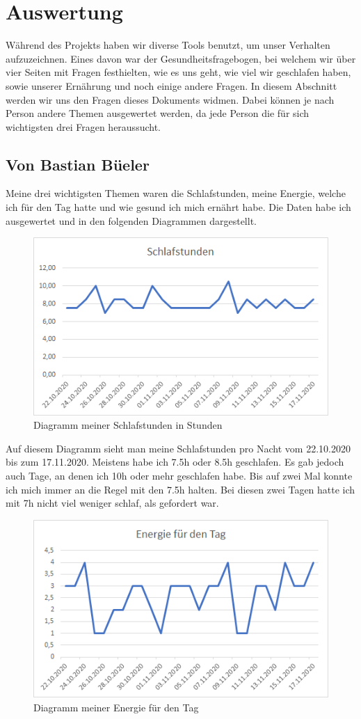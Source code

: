 \section{Auswertung}
\authortoc{\bastian}{\sectionident}
Während des Projekts haben wir diverse Tools benutzt, um unser Verhalten aufzuzeichnen. Eines davon war der Gesundheitsfragebogen, bei welchem wir über vier Seiten mit Fragen festhielten, wie es uns geht, wie viel wir geschlafen haben, sowie unserer Ernährung und noch einige andere Fragen. In diesem Abschnitt werden wir uns den Fragen dieses Dokuments widmen. Dabei können je nach Person andere Themen ausgewertet werden, da jede Person die für sich wichtigsten drei Fragen heraussucht.
\subsection{Von Bastian Büeler}
\authortoc{\bastian}{\subsectionident}
Meine drei wichtigsten Themen waren die Schlafstunden, meine Energie, welche ich für den Tag hatte und wie gesund ich mich ernährt habe.
Die Daten habe ich ausgewertet und in den folgenden Diagrammen dargestellt.
\newline
\begin{figure}[H]
  \centering
  \includegraphics[width=0.7\linewidth]{./images/bastian_schlaf.png}
  \caption{Diagramm meiner Schlafstunden in Stunden}
\end{figure}
Auf diesem Diagramm sieht man meine Schlafstunden pro Nacht vom 22.10.2020 bis zum 17.11.2020. Meistens habe ich 7.5h oder 8.5h geschlafen. Es gab jedoch auch Tage, an denen ich 10h oder mehr geschlafen habe. Bis auf zwei Mal konnte ich mich immer an die Regel mit den 7.5h halten. Bei diesen zwei Tagen hatte ich mit 7h nicht viel weniger schlaf, als gefordert war.
\newline
\begin{figure}[H]
  \centering
  \includegraphics[width=0.7\linewidth]{./images/bastian_energy.png}
  \caption{Diagramm meiner Energie für den Tag}
\end{figure}
